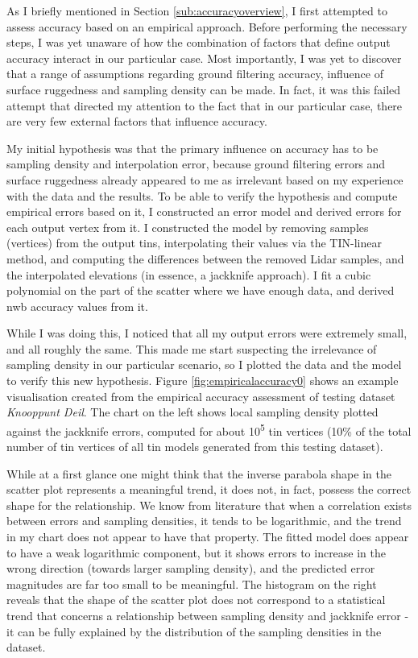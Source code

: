 As I briefly mentioned in Section \ref{sub:accuracyoverview}, I first attempted to assess accuracy based on an empirical approach. Before performing the necessary steps, I was yet unaware of how the combination of factors that define output accuracy interact in our particular case. Most importantly, I was yet to discover that a range of assumptions regarding ground filtering accuracy, influence of surface ruggedness and sampling density can be made. In fact, it was this failed attempt that directed my attention to the fact that in our particular case, there are very few external factors that influence accuracy.

My initial hypothesis was that the primary influence on accuracy has to be sampling density and interpolation error, because ground filtering errors and surface ruggedness already appeared to me as irrelevant based on my experience with the data and the results. To be able to verify the hypothesis and compute empirical errors based on it, I constructed an error model and derived errors for each output vertex from it. I constructed the model by removing samples (vertices) from the output \ac{tin}s, interpolating their values via the TIN-linear method, and computing the differences between the removed Lidar samples, and the interpolated elevations (in essence, a jackknife approach). I fit a cubic polynomial on the part of the scatter where we have enough data, and derived \ac{nwb} accuracy values from it.

While I was doing this, I noticed that all my output errors were extremely small, and all roughly the same. This made me start suspecting the irrelevance of sampling density in our particular scenario, so I plotted the data and the model to verify this new hypothesis. Figure \ref{fig:empiricalaccuracy0} shows an example visualisation created from the empirical accuracy assessment of testing dataset \textit{Knooppunt Deil}. The chart on the left shows local sampling density plotted against the jackknife errors, computed for about 10\textsuperscript{5} \ac{tin} vertices (10\% of the total number of \ac{tin} vertices of all \ac{tin} models generated from this testing dataset).

While at a first glance one might think that the inverse parabola shape in the scatter plot represents a meaningful trend, it does not, in fact, possess the correct shape for the relationship. We know from literature that when a correlation exists between errors and sampling densities, it tends to be logarithmic, and the trend in my chart does not appear to have that property. The fitted model does appear to have a weak logarithmic component, but it shows errors to increase in the wrong direction (towards larger sampling density), and the predicted error magnitudes are far too small to be meaningful. The histogram on the right reveals that the shape of the scatter plot does not correspond to a statistical trend that concerns a relationship between sampling density and jackknife error - it can be fully explained by the distribution of the sampling densities in the dataset.

